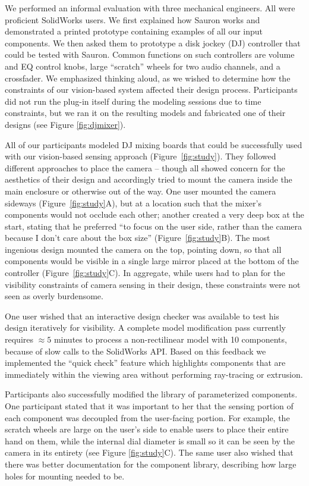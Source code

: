     We performed an informal evaluation with three mechanical engineers. All were proficient SolidWorks users. We first explained how Sauron works and demonstrated a printed prototype containing examples of all our input components. We then asked them to prototype a disk jockey (DJ) controller that could be tested with Sauron. Common functions on such controllers are volume and EQ control knobs, large ``scratch'' wheels for two audio channels, and a crossfader. We emphasized thinking aloud, as we wished to determine how the constraints of our vision-based system affected their design process. Participants did not run the plug-in itself during the modeling sessions due to time constraints, but we ran it on the resulting models and fabricated one of their designs (see Figure \ref{fig:djmixer}).

    All of our participants modeled DJ mixing boards that could be successfully used with our vision-based sensing approach (Figure~\ref{fig:study}). They followed different approaches to place the camera -- though all showed concern for the aesthetics of their design and accordingly tried to mount the camera inside the main enclosure or otherwise out of the way. One user mounted the camera sideways (Figure~\ref{fig:study}A), but at a location such that the mixer's components would not occlude each other; another created a very deep box at the start, stating that he preferred ``to focus on the user side, rather than the camera because I don't care about the box size'' (Figure~\ref{fig:study}B). The most ingenious design mounted the camera on the top, pointing down, so that all components would be visible in a single large mirror placed at the bottom of the controller (Figure~\ref{fig:study}C). In aggregate, while users had to plan for the visibility constraints of camera sensing in their design, these constraints were not seen as overly burdensome.

    One user wished that an interactive design checker was available to test his design iteratively for visibility. A complete model modification pass currently requires $\approx 5$ minutes to process a non-rectilinear model with 10 components, because of slow calls to the SolidWorks API. Based on this feedback we implemented the ``quick check'' feature which highlights components that are immediately within the viewing area without performing ray-tracing or extrusion.

    Participants also successfully modified the library of parameterized components. One participant stated that it was important to her that the sensing portion of each component was decoupled from the user-facing portion. For example, the scratch wheels are large on the user's side to enable users to place their entire hand on them, while the internal dial diameter is small so it can be seen by the camera in its entirety (see Figure \ref{fig:study}C). The same user also wished that there was better documentation for the component library, describing how large holes for mounting needed to be.



